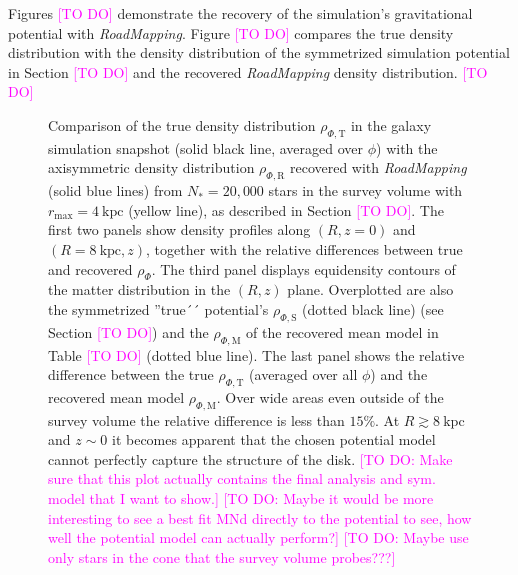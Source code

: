 \documentclass[iop,revtex4,numberedappendix,appendixfloats]{emulateapj}
\newcommand{\RM}{{\sl RoadMapping}}
\newcommand{\Wilma}[1]{\textcolor{Magenta}{#1}}
\begin{document}
Figures \Wilma{[TO DO]} demonstrate the recovery of the simulation's gravitational potential with \RM{}. Figure \Wilma{[TO DO]} compares the true density distribution with the density distribution of the symmetrized simulation potential in Section \Wilma{[TO DO]} and the recovered \RM{} density distribution. \Wilma{[TO DO]}

\begin{figure}[!htbp]
\caption{Comparison of the true density distribution $\rho_{\Phi,\text{T}}$ in the galaxy simulation snapshot (solid black line, averaged over $\phi$) with the axisymmetric density distribution $\rho_{\Phi,\text{R}}$ recovered with \RM{} (solid blue lines) from $N_*=20,000$ stars in the survey volume with $r_\text{max}=4~\text{kpc}$ (yellow line), as described in Section \Wilma{[TO DO]}. The first two panels show density profiles along $(R,z=0)$ and $(R=8~\text{kpc},z)$, together with the relative differences between true and recovered $\rho_{\Phi}$. The third panel displays equidensity contours of the matter distribution in the $(R,z)$ plane. Overplotted are also the symmetrized ''true´´ potential's $\rho_{\Phi,\text{S}}$ (dotted black line) (see Section \Wilma{[TO DO]}) and the $\rho_{\Phi,\text{M}}$ of the recovered mean model in Table \Wilma{[TO DO]} (dotted blue line). The last panel shows the relative difference between the true $\rho_{\Phi,\text{T}}$ (averaged over all $\phi$) and the recovered mean model $\rho_{\Phi,\text{M}}$. Over wide areas even outside of the survey volume the relative difference is less than $15\%$. At $R\gtrsim8~\text{kpc}$ and $z\sim0$ it becomes apparent that the chosen potential model cannot perfectly capture the structure of the disk. \Wilma{[TO DO: Make sure that this plot actually contains the final analysis and sym. model that I want to show.]} \Wilma{[TO DO: Maybe it would be more interesting to see a best fit MNd directly to the potential to see, how well the potential model can actually perform?]} \Wilma{[TO DO: Maybe use only stars in the cone that the survey volume probes???]}}
\label{fig:???}
\end{figure}
\end{document}
